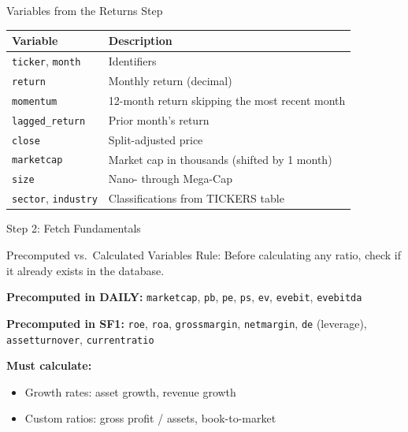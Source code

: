 \documentclass[aspectratio=169,t]{beamer}
\begin{document}
\begin{frame}{Variables from the Returns Step}
\begin{center}
\begin{tabular}{ll}
\toprule
\textbf{Variable} & \textbf{Description} \\
\midrule
\texttt{ticker}, \texttt{month} & Identifiers \\
\texttt{return} & Monthly return (decimal) \\
\texttt{momentum} & 12-month return skipping the most recent month \\
\texttt{lagged\_return} & Prior month's return \\
\texttt{close} & Split-adjusted price \\
\texttt{marketcap} & Market cap in thousands (\alert{shifted by 1 month}) \\
\texttt{size} & Nano- through Mega-Cap \\
\texttt{sector}, \texttt{industry} & Classifications from TICKERS table \\
\bottomrule
\end{tabular}
\end{center}
\end{frame}


\begin{frame}[c]
\centering
\Huge Step 2: Fetch Fundamentals
\end{frame}

\begin{frame}{Precomputed vs.\ Calculated Variables}
\alert{Rule:} Before calculating any ratio, check if it already exists in the database.
\vspace{0.2cm}

\textbf{Precomputed in DAILY:} \texttt{marketcap}, \texttt{pb}, \texttt{pe}, \texttt{ps}, \texttt{ev}, \texttt{evebit}, \texttt{evebitda}
\vspace{0.2cm}

\textbf{Precomputed in SF1:} \texttt{roe}, \texttt{roa}, \texttt{grossmargin}, \texttt{netmargin}, \texttt{de} (leverage), \texttt{assetturnover}, \texttt{currentratio}
\vspace{0.2cm}

\textbf{Must calculate:}
\begin{itemize}
\item Growth rates: asset growth, revenue growth
\item Custom ratios: gross profit / assets, book-to-market
\end{itemize}
\end{frame}
\end{document}
